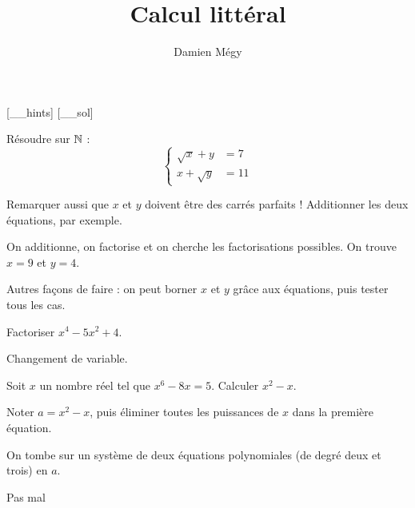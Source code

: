 




[_\jobname_hints]
[_\jobname_sol]


\title{Calcul littéral}
\author{Damien Mégy}
\maketitle


\begin{exo}
Résoudre sur $\mathbb N$ : 
\[ 
\begin{cases}
\sqrt x + y &= 7 \\
x+\sqrt y &= 11
\end{cases}
\]
\begin{hint}
Remarquer aussi que $x$ et $y$ doivent être des carrés parfaits !
Additionner les deux équations, par exemple. 
\end{hint}
\begin{sol}
On additionne, on factorise et on cherche les factorisations possibles. On trouve $x=9$ et $y=4$.

Autres façons de faire : on peut borner $x$ et $y$ grâce aux équations, puis tester tous les cas.
\end{sol}
\end{exo}


\begin{exo}
Factoriser $x^4-5x^2+4$.
\begin{hint}
Changement de variable.
\end{hint}
\begin{sol}
\end{sol}
\end{exo}



\begin{exo}
Soit $x$ un nombre réel tel que $x^6-8x=5$. Calculer $x^2-x$.
\begin{hint}
Noter $a=x^2-x$, puis éliminer toutes les puissances de $x$ dans la première équation. 
\end{hint}
\begin{sol}
On tombe sur un système de deux équations polynomiales (de degré deux et trois) en $a$.

Pas mal
\end{sol}
\end{exo}



